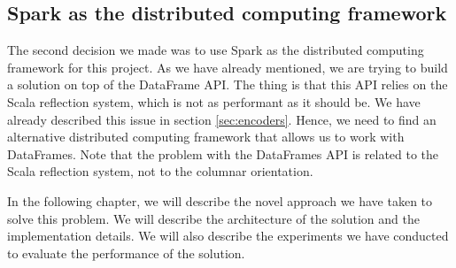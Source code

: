 \subsection{Spark as the distributed computing framework}

The second decision we made was to use Spark as the distributed computing framework for this project. As we have already mentioned, we are trying to build a solution on top of the DataFrame API. The thing is that this API relies on the Scala reflection system, which is not as performant as it should be. We have already described this issue in section \ref{sec:encoders}. Hence, we need to find an alternative distributed computing framework that allows us to work with DataFrames. Note that the problem with the DataFrames API is related to the Scala reflection system, not to the columnar orientation.

In the following chapter, we will describe the novel approach we have taken to solve this problem. We will describe the architecture of the solution and the implementation details. We will also describe the experiments we have conducted to evaluate the performance of the solution.
